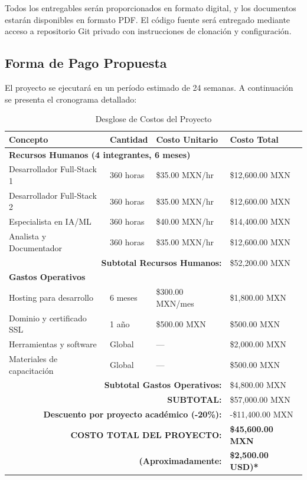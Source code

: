 \documentclass[12pt,letterpaper]{article}
\begin{document}
Todos los entregables serán proporcionados en formato digital, y los documentos estarán disponibles en formato PDF. El código fuente será entregado mediante acceso a repositorio Git privado con instrucciones de clonación y configuración.

\newpage

\subsection{Forma de Pago Propuesta}

El proyecto se ejecutará en un período estimado de 24 semanas. A continuación se presenta el cronograma detallado:

\begin{table}[h]
\centering
\caption{Desglose de Costos del Proyecto}
\label{tab:costos}
\small
\begin{tabular}{|p{6cm}|p{2cm}|p{2.5cm}|p{3cm}|}
\hline
\textbf{Concepto} & \textbf{Cantidad} & \textbf{Costo Unitario} & \textbf{Costo Total} \\
\hline
\hline
\multicolumn{4}{|l|}{\textbf{Recursos Humanos (4 integrantes, 6 meses)}} \\
\hline
Desarrollador Full-Stack 1 & 360 horas & \$35.00 MXN/hr & \$12,600.00 MXN \\
\hline
Desarrollador Full-Stack 2 & 360 horas & \$35.00 MXN/hr & \$12,600.00 MXN \\
\hline
Especialista en IA/ML & 360 horas & \$40.00 MXN/hr & \$14,400.00 MXN \\
\hline
Analista y Documentador & 360 horas & \$35.00 MXN/hr & \$12,600.00 MXN \\
\hline
\multicolumn{3}{|r|}{\textbf{Subtotal Recursos Humanos:}} & \$52,200.00 MXN \\
\hline
\hline
\multicolumn{4}{|l|}{\textbf{Gastos Operativos}} \\
\hline
Hosting para desarrollo & 6 meses & \$300.00 MXN/mes & \$1,800.00 MXN \\
\hline
Dominio y certificado SSL & 1 año & \$500.00 MXN & \$500.00 MXN \\
\hline
Herramientas y software & Global & --- & \$2,000.00 MXN \\
\hline
Materiales de capacitación & Global & --- & \$500.00 MXN \\
\hline
\multicolumn{3}{|r|}{\textbf{Subtotal Gastos Operativos:}} & \$4,800.00 MXN \\
\hline
\hline
\multicolumn{3}{|r|}{\textbf{SUBTOTAL:}} & \$57,000.00 MXN \\
\hline
\multicolumn{3}{|r|}{\textbf{Descuento por proyecto académico (-20\%):}} & -\$11,400.00 MXN \\
\hline
\hline
\multicolumn{3}{|r|}{\textbf{COSTO TOTAL DEL PROYECTO:}} & \textbf{\$45,600.00 MXN} \\
\hline
\multicolumn{3}{|r|}{\textbf{(Aproximadamente:}} & \textbf{\$2,500.00 USD)*} \\
\hline
\end{tabular}
\end{table}
\end{document}
